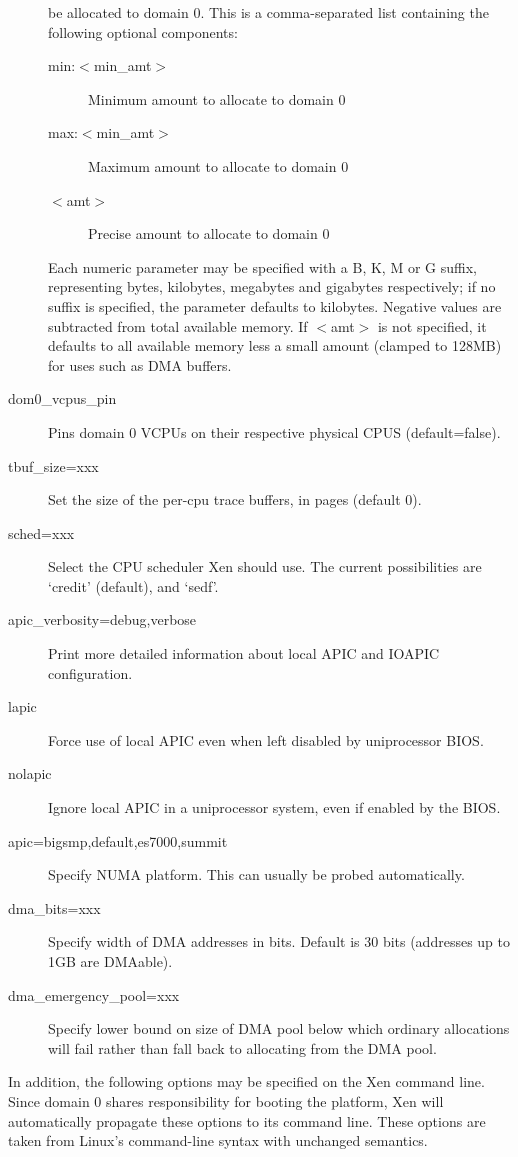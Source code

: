 \documentclass[11pt,twoside,final,openright]{report}
\begin{document}
\begin{description}
  be allocated to domain 0. This is a comma-separated list containing
  the following optional components:
  \begin{description}
  \item[ min:$<$min\_amt$>$ ] Minimum amount to allocate to domain 0
  \item[ max:$<$min\_amt$>$ ] Maximum amount to allocate to domain 0
  \item[ $<$amt$>$ ] Precise amount to allocate to domain 0
  \end{description}
  Each numeric parameter may be specified with a B, K, M or
  G suffix, representing bytes, kilobytes, megabytes and gigabytes
  respectively; if no suffix is specified, the parameter defaults to
  kilobytes. Negative values are subtracted from total available
  memory. If $<$amt$>$ is not specified, it defaults to all available
  memory less a small amount (clamped to 128MB) for uses such as DMA
  buffers.
\item [ dom0\_vcpus\_pin ] Pins domain 0 VCPUs on their respective
  physical CPUS (default=false).
\item [ tbuf\_size=xxx ] Set the size of the per-cpu trace buffers, in
  pages (default 0).  
\item [ sched=xxx ] Select the CPU scheduler Xen should use.  The
  current possibilities are `credit' (default), and `sedf'.
\item [ apic\_verbosity=debug,verbose ] Print more detailed
  information about local APIC and IOAPIC configuration.
\item [ lapic ] Force use of local APIC even when left disabled by
  uniprocessor BIOS.
\item [ nolapic ] Ignore local APIC in a uniprocessor system, even if
  enabled by the BIOS.
\item [ apic=bigsmp,default,es7000,summit ] Specify NUMA platform.
  This can usually be probed automatically.
\item [ dma\_bits=xxx ] Specify width of DMA
  addresses in bits. Default is 30 bits (addresses up to 1GB are DMAable).
\item [ dma\_emergency\_pool=xxx ] Specify lower bound on size of DMA
  pool below which ordinary allocations will fail rather than fall
  back to allocating from the DMA pool.
\end{description}

In addition, the following options may be specified on the Xen command
line. Since domain 0 shares responsibility for booting the platform,
Xen will automatically propagate these options to its command line.
These options are taken from Linux's command-line syntax with
unchanged semantics.
\end{document}
